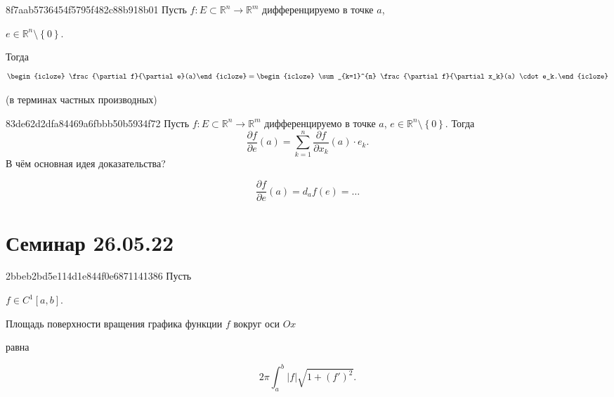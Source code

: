 \begin{note}{8f7aab5736454f5795f482c88b918b01}
    Пусть \({ f : E \subset \mathbb R^{n} \to \mathbb R^{m} }\) дифференцируемо в точке \({ a }\),\: \begin{icloze}{3}\({ e \in \mathbb R^{n} \setminus \left\{ 0 \right\} }\).\end{icloze}
    Тогда
    \[
        \begin{icloze}{2}\frac{\partial f}{\partial e}(a)\end{icloze} = \begin{icloze}{1}\sum_{k=1}^{n} \frac{\partial f}{\partial x_k}(a) \cdot e_k.\end{icloze}
    \]

    \begin{center}
        \tiny
        (в терминах частных производных)
    \end{center}
\end{note}

\begin{note}{83de62d2dfa84469a6fbbb50b5934f72}
    Пусть \({ f : E \subset \mathbb R^{n} \to \mathbb R^{m} }\) дифференцируемо в точке \({ a }\),\: \({ e \in \mathbb R^{n} \setminus \left\{ 0 \right\} }\).
    Тогда
    \[
        \frac{\partial f}{\partial e}(a) = \sum_{k=1}^{n} \frac{\partial f}{\partial x_k}(a) \cdot e_k.
    \]
    В чём основная идея доказательства?

    \begin{cloze}{1}
        \[
            \frac{\partial f}{\partial e}(a) = d_{a}f(e) = \ldots
        \]
    \end{cloze}
\end{note}

\section{Семинар 26.05.22}
\begin{note}{2bbeb2bd5e114d1e844f0e6871141386}
    Пусть \begin{icloze}{3}\({ f \in C^{1}[a, b] }\).\end{icloze} \begin{icloze}{2}Площадь поверхности вращения графика функции \({ f }\) вокруг оси \({ Ox }\)\end{icloze} равна
    \begin{icloze}{1}
        \[
            2\pi \int_{a}^{b} \left\lvert f \right\rvert \sqrt{1 + \left( f' \right)^2}.
        \]
    \end{icloze}
\end{note}

